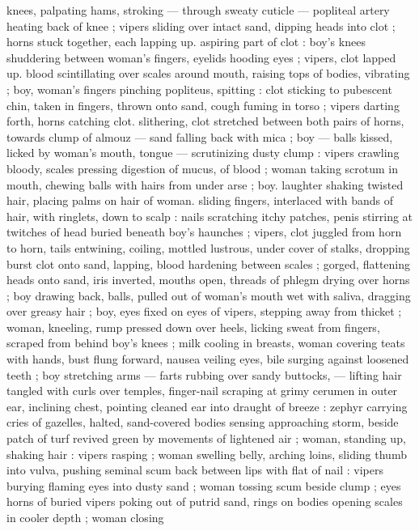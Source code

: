 knees, palpating hams, stroking --- through sweaty cuticle --- 
popliteal artery heating back of knee ; vipers sliding over intact 
sand, dipping heads into clot ; horns stuck together, each lapping up. 
aspiring part of clot : boy's knees shuddering between woman's 
fingers, eyelids hooding eyes ; vipers, clot lapped up. blood 
scintillating over scales around mouth, raising tops of bodies, 
vibrating ; boy, woman's fingers pinching popliteus, spitting : clot 
sticking to pubescent chin, taken in fingers, thrown onto sand, cough 
fuming in torso ; vipers darting forth, horns catching clot. slithering, 
clot stretched between both pairs of horns, towards clump of almouz 
--- sand falling back with mica ; boy --- balls kissed, licked by 
woman's mouth, tongue --- scrutinizing dusty clump : vipers crawling 
bloody, scales pressing digestion of mucus, of blood ; woman taking 
scrotum in mouth, chewing balls with hairs from under arse ; boy. 
laughter shaking twisted hair, placing palms on hair of woman. sliding 
fingers, interlaced with bands of hair, with ringlets, down to scalp : 
nails scratching itchy patches, penis stirring at twitches of head 
buried beneath boy's haunches ; vipers, clot juggled from horn to 
horn, tails entwining, coiling, mottled lustrous, under cover of stalks, 
dropping burst clot onto sand, lapping, blood hardening between 
scales ; gorged, flattening heads onto sand, iris inverted, mouths 
open, threads of phlegm drying over horns ; boy drawing back, balls, 
pulled out of woman's mouth wet with saliva, dragging over greasy 
hair ; boy, eyes fixed on eyes of vipers, stepping away from thicket ; 
woman, kneeling, rump pressed down over heels, licking sweat from 
fingers, scraped from behind boy's knees ; milk cooling in breasts, 
woman covering teats with hands, bust flung forward, nausea veiling 
eyes, bile surging against loosened teeth ; boy stretching arms --- 
farts rubbing over sandy buttocks, --- lifting hair tangled with curls 
over temples, finger-nail scraping at grimy cerumen in outer ear, 
inclining chest, pointing cleaned ear into draught of breeze : zephyr 
carrying cries of gazelles, halted, sand-covered bodies sensing 
approaching storm, beside patch of turf revived green by 
movements of lightened air ; woman, standing up, shaking hair : 
vipers rasping ; woman swelling belly, arching loins, sliding thumb 
into vulva, pushing seminal scum back between lips with flat of nail : 
vipers burying flaming eyes into dusty sand ; woman tossing scum 
beside clump ; eyes horns of buried vipers poking out of putrid 
sand, rings on bodies opening scales in cooler depth ; woman closing 
